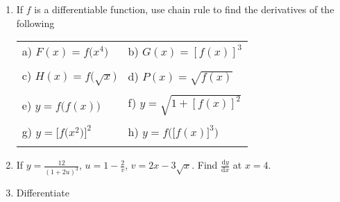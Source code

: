 \documentclass{article}
\begin{document}
\newcommand{\ud}{\mathrm d}
\begin{enumerate}
\item If $f$ is a differentiable function, use chain rule to 
find the derivatives of the following

\begin{tabular}{ll}
a) $F(x)=f\big(x^4\big)$ \hspace{3cm} & b) $G(x)=[f(x)]^3$ \\
\vspace{3cm} & \\
c) $H(x)=f\big(\sqrt x\big)$ & d) $P(x)=\sqrt{f(x)}$ \\
\vspace{3cm} & \\
e) $y=f\big(f(x)\big)$ & f) $y=\sqrt{1+[f(x)]^2}$ \\
\vspace{3cm} & \\
g) $y=\big[f\big(x^2\big)\big]^2$ & h) $y=f\Big(\big[f(x)\big]^3\Big)$ \\
\vspace{3cm} & \\
\end{tabular}
\item If $y=\frac{12}{(1+2u)^3}$, $u=1-\frac 2 v$,
$v=2x-3\sqrt x$. Find $\frac{\ud y}{\ud x}$ at $x=4$.
\vspace{9cm}
\item Differentiate 


\end{enumerate}
\end{document}
